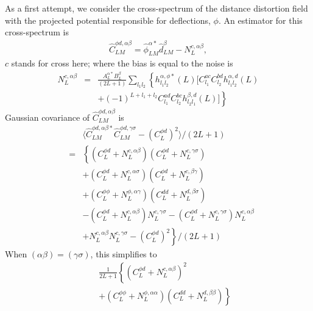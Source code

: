 \documentclass[prl,amsmath,amssymb,floatfix,superscriptaddress,nofootinbib,twocolumn]{revtex4-1}
\def\bea{\begin{eqnarray}}
\def\eea{\end{eqnarray}}
\newcommand{\eql}[1]{\label{eq:#1}}
\begin{document}
As a first attempt, we consider the cross-spectrum of the distance distortion field with the projected potential responsible for deflections, $\phi$. An estimator for this cross-spectrum is 
\bea
\hat{C}_{LM}^{\phi d,\alpha \beta} = \hat{\phi}^{\alpha*}_{LM}\hat{d}^{\beta}_{LM}-N_{L}^{c,\alpha \beta},
\eea 
$c$ stands for cross here; where the bias is equal to the noise is
\bea
N_{L}^{c,\alpha\beta}&=&\frac{A_{L}^{\alpha*}B_{L}^{\beta}}{(2L+1)}\sum_{l_{1}l_{2}}  \left\{ h_{l_{1}l_{2}}^{\alpha,\phi*} (L)\big[ C_{l_{1}}^{ac}C_{l_{2}}^{bd}h_{l_{1}l_{2}}^{\alpha,d}(L)\right. \nonumber \\
&&\left. +(-1)^{L+l_{1}+l_{2}}C_{l_{1}}^{ad}C_{l_{2}}^{bc} h_{l_{2}l_{1}}^{\beta,d}(L)  \big]\right\}\eql{full} 
\eea
Gaussian covariance of $\hat{C}_{LM}^{\phi d,\alpha \beta} $ is
\bea 
&&\big\langle \hat{C}_{LM}^{\phi d,\alpha \beta*} \hat{C}_{LM}^{\phi d,\gamma \sigma} - (C_{L}^{\phi d})^{2} \big\rangle/(2L+1) \nonumber \\
&=&\left\{(C_{L}^{\phi d}+N_{L}^{c,\alpha \beta})(C_{L}^{\phi d}+N_{L}^{c,\gamma \sigma})\right. \nonumber \\
&&+(C_{L}^{\phi d}+N_{L}^{c,\alpha \sigma})(C_{L}^{\phi d}+N_{L}^{c,\beta \gamma})\nonumber \\
&&+(C_{L}^{\phi \phi}+N_{L}^{\phi,\alpha \gamma})(C_{L}^{d d}+N_{L}^{d,\beta \sigma})\nonumber\\
&&-(C_{L}^{\phi d}+N_{L}^{c,\alpha \beta})N_{L}^{c,\gamma \sigma}-(C_{L}^{\phi d}+N_{L}^{c,\gamma \sigma})N_{L}^{c,\alpha \beta}\nonumber \\
&&\left. +N_{L}^{c,\alpha \beta}N_{L}^{c,\gamma \sigma}-(C_{L}^{\phi d})^{2}\right\}/(2L+1)
\eea
When $(\alpha\beta)=(\gamma \sigma)$, this simplifies to
\bea 
&&\frac{1}{2L+1}\left\{(C_{L}^{\phi d}+N_{L}^{c,\alpha \beta})^{2}\right. \nonumber \\
&&\left. 
+(C_{L}^{\phi \phi} +N_{L}^{\phi,\alpha \alpha})(C_{L}^{d d}+N_{L}^{d,\beta \beta})\right\}
\eea
\noindent 
\end{document}
